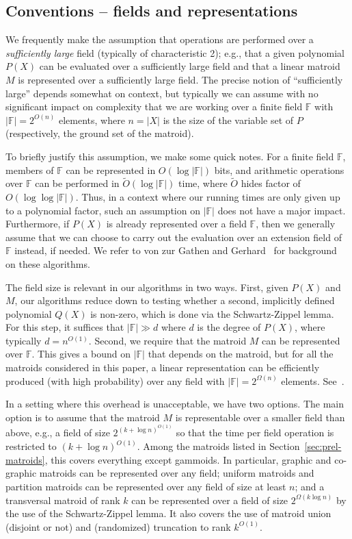 \documentclass[10pt,a4paper]{article}
\newcommand{\F}{\ensuremath{\mathbb F}\xspace}
\begin{document}
\subsection{Conventions -- fields and representations}
\label{subsec:conventions}
We frequently make the assumption that operations are performed over a
\emph{sufficiently large} field (typically of characteristic 2); e.g.,
that a given polynomial $P(X)$ can be evaluated over a sufficiently
large field and that a linear matroid $M$ is represented over a
sufficiently large field. The precise notion of ``sufficiently large''
depends somewhat on context, but typically we can assume with no
significant impact on complexity that we are working over a finite field $\F$ with
$|\F|=2^{O(n)}$ elements, where $n=|X|$ is the size of the variable
set of $P$ (respectively, the ground set of the matroid). 

To briefly justify this assumption, we make some quick notes. 
For a finite field $\F$, members of $\F$ can be represented in $O(\log |\F|)$ bits, 
and arithmetic operations over $\F$ can be performed in $\tilde O(\log |\F|)$ time,
where $\tilde O$ hides factor of $O(\log \log |\F|)$. Thus,
in a context where our running times are only given up to a polynomial
factor, such an assumption on $|\F|$ does not have a major impact.
Furthermore, if $P(X)$ is already represented over a field $\F$,
then we generally assume that we can choose to carry out the
evaluation over an extension field of $\F$ instead, if needed.
We refer to von zur Gathen and Gerhard~\cite{vzGathen-MCA} for
background on these algorithms. 

The field size is relevant in our algorithms in two ways. First,
given $P(X)$ and $M$, our algorithms reduce down to testing whether a
second, implicitly defined polynomial $Q(X)$ is non-zero, which
is done via the Schwartz-Zippel lemma. For this step, it suffices
that $|\F| \gg d$ where $d$ is the degree of $P(X)$, where
typically $d=n^{O(1)}$. Second, we require that the matroid $M$ can be
represented over $\F$. This gives a bound on $|\F|$ that depends on
the matroid, but for all the matroids considered in this paper,
a linear representation can be efficiently produced (with high probability)
over any field with $|\F|=2^{\Omega(n)}$ elements. See~\cite{OxleyBook,Marx09-matroid}.

In a setting where this overhead is unacceptable, we have two options.
The main option is to assume that the matroid $M$ is representable over
a smaller field than above, e.g., a field of size $2^{(k+\log n)^{O(1)}}$
so that the time per field operation is restricted to $(k+\log n)^{O(1)}$.
Among the matroids listed in Section~\ref{sec:prel-matroids},
this covers everything except gammoids. In particular, 
graphic and co-graphic matroids can be represented over
any field; uniform matroids and partition matroids can be represented over any field of size at least $n$;  
and a transversal matroid of rank $k$ can be represented over a field
of size $2^{\Omega(k \log n)}$ by the use of the Schwartz-Zippel lemma.
It also covers the use of matroid union (disjoint or not)
and (randomized) truncation to rank $k^{O(1)}$.
\end{document}
